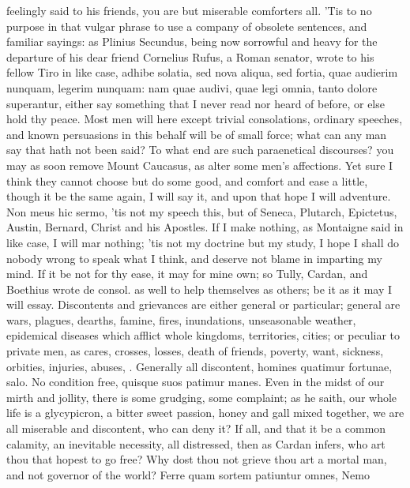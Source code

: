 { feelingly said to his friends, you are but miserable comforters
all. 'Tis to no purpose in that vulgar phrase to use a company of
obsolete sentences, and familiar sayings: as Plinius Secundus,
being now sorrowful and heavy for the departure of his dear friend
Cornelius Rufus, a Roman senator, wrote to his fellow Tiro in like
case, adhibe solatia, sed nova aliqua, sed fortia, quae audierim
nunquam, legerim nunquam: nam quae audivi, quae legi omnia, tanto
dolore superantur, either say something that I never read nor heard of
before, or else hold thy peace. Most men will here except trivial
consolations, ordinary speeches, and known persuasions in this behalf
will be of small force; what can any man say that hath not been said?
To what end are such paraenetical discourses? you may as soon remove
Mount Caucasus, as alter some men's affections. Yet sure I think they
cannot choose but do some good, and comfort and ease a little, though
it be the same again, I will say it, and upon that hope I will
adventure. Non meus hic sermo, 'tis not my speech this, but of
Seneca, Plutarch, Epictetus, Austin, Bernard, Christ and his Apostles.
If I make nothing, as Montaigne said in like case, I will mar
nothing; 'tis not my doctrine but my study, I hope I shall do nobody
wrong to speak what I think, and deserve not blame in imparting my
mind. If it be not for thy ease, it may for mine own; so Tully, Cardan,
and Boethius wrote de consol. as well to help themselves as others; be
it as it may I will essay.
Discontents and grievances are either general or particular; general
are wars, plagues, dearths, famine, fires, inundations, unseasonable
weather, epidemical diseases which afflict whole kingdoms, territories,
cities; or peculiar to private men, as cares, crosses, losses,
death of friends, poverty, want, sickness, orbities, injuries, abuses,
\etc{}. Generally all discontent, homines quatimur fortunae, salo. No
condition free, quisque suos patimur manes. Even in the midst of our
mirth and jollity, there is some grudging, some complaint; as he
saith, our whole life is a glycypicron, a bitter sweet passion, honey
and gall mixed together, we are all miserable and discontent, who can
deny it? If all, and that it be a common calamity, an inevitable
necessity, all distressed, then as Cardan infers, who art thou
that hopest to go free? Why dost thou not grieve thou art a mortal man,
and not governor of the world? Ferre quam sortem patiuntur omnes, Nemo
}

